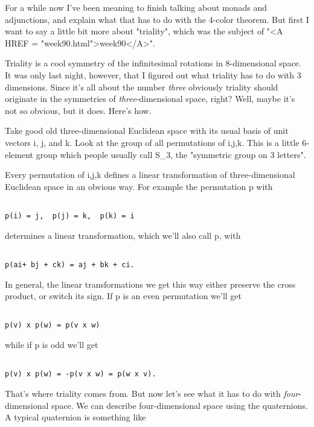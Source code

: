 


For a while now I've been meaning to finish talking about monads
and adjunctions, and explain what that has to do with the 4-color 
theorem.  But first I want to say a little bit more about "triality", 
which was the subject of "<A HREF = "week90.html">week90</A>".

Triality is a cool symmetry of the infinitesimal rotations in
8-dimensional space.  It was only last night, however, that I figured
out what triality has to do with 3 dimensions.  Since it's all about
the number \emph{three} obviously triality should originate in the
symmetries of \emph{three}-dimensional space, right?  Well, maybe
it's not so obvious, but it does.  Here's how.

Take good old three-dimensional Euclidean space with its usual
basis of unit vectors i, j, and k.  Look at the group of all
permutations of {i,j,k}.  This is a little 6-element group
which people usually call S_{3}, 
the "symmetric group on 3 letters".

Every permutation of {i,j,k} defines a linear transformation
of three-dimensional Euclidean space in an obvious way.  For 
example the permutation p with


\begin{verbatim}

p(i) = j,  p(j) = k,  p(k) = i
\end{verbatim}
    
determines a linear transformation, which we'll also call p, with


\begin{verbatim}

p(ai+ bj + ck) = aj + bk + ci.
\end{verbatim}
    
In general, the linear transformations we get this way
either preserve the cross product, or switch its sign.
If p is an even permutation we'll get


\begin{verbatim}

p(v) x p(w) = p(v x w)
\end{verbatim}
    
while if p is odd we'll get 


\begin{verbatim}

p(v) x p(w) = -p(v x w) = p(w x v).
\end{verbatim}
    
That's where triality comes from.  But now let's see what it
has to do with \emph{four}-dimensional space.  
We can describe four-dimensional
space using the quaternions.  A typical quaternion is something like


